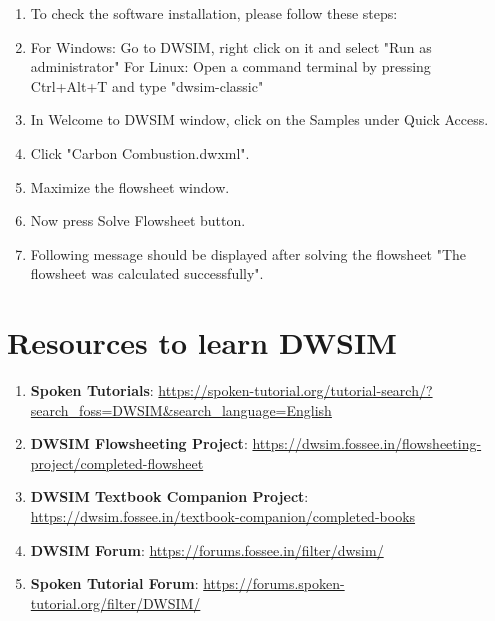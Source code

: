 \documentclass[a4paper,12pt]{article}
\begin{document}
\begin{enumerate}

\item To check the software installation, please follow these steps:
\item For Windows: Go to DWSIM, right click on it and select "Run as administrator"
\newline For Linux: Open a command terminal by pressing Ctrl+Alt+T and type "dwsim-classic"
\item In Welcome to DWSIM window, click on the Samples under Quick Access.
\item Click "Carbon Combustion.dwxml".
\item Maximize the flowsheet window.
\item Now press Solve Flowsheet button.
\item Following message should be displayed after solving the flowsheet "The flowsheet was calculated successfully".

\end{enumerate}
\section{Resources to learn DWSIM}

\begin{enumerate}

\item \textbf{Spoken Tutorials}: \url{https://spoken-tutorial.org/tutorial-search/?search_foss=DWSIM&search_language=English}
\item \textbf{DWSIM Flowsheeting Project}: \url{https://dwsim.fossee.in/flowsheeting-project/completed-flowsheet}
\item \textbf{DWSIM Textbook Companion Project}: \url{https://dwsim.fossee.in/textbook-companion/completed-books}
\item \textbf{DWSIM Forum}: \url{https://forums.fossee.in/filter/dwsim/}
\item \textbf{Spoken Tutorial Forum}: \url{https://forums.spoken-tutorial.org/filter/DWSIM/}
\end{enumerate}
\end{document}
